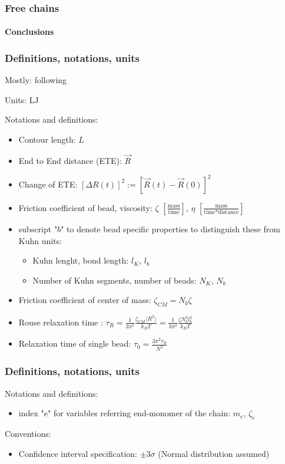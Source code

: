 \documentclass[handout]{beamer}
\newcommand{\mean}[1]{\langle #1 \rangle}
\begin{document}
\begin{frame}
    \frametitle{Free chains}
    \framesubtitle{Conclusions}

\end{frame}

\begin{frame}
    \frametitle{Definitions, notations, units}
    Mostly: following \cite{svaneborg_2020}

    Units: LJ

    Notations and definitions:

    \begin{itemize}
        \item Contour length: $L$
        \item End to End distance (ETE): $\vec{R}$
        \item Change of ETE: $[\Delta R(t)]^2 := [\vec{R}(t)-\vec{R}(0)]^2$
        \item Friction coefficient of bead, viscosity: $\zeta$ $[\frac{\textrm{mass}}{\textrm{time}}]$, $\eta$ $[\frac{\textrm{mass}}{\textrm{time} * \textrm{distance}}]$
        \item subscript "$b$" to denote bead speciﬁc properties to distinguish these from Kuhn units:
            \begin{itemize}
                \item Kuhn lenght, bond length: $l_K$, $l_b$
                \item Number of Kuhn segments, number of beads: $N_K$, $N_b$
            \end{itemize}
        \item Friction coefficient of center of mass: $\zeta_{CM}=N_b \zeta$ 
        \item Rouse relaxation time \cite{svaneborg_2020}: $\tau_R = \frac{1}{3 \pi^2} \frac{\zeta_{CM} \mean{R^2}}{k_B T} = \frac{1}{3 \pi^2} \frac{\zeta N_b^2 l_b^2}{k_B T}$
        \item Relaxation time of single bead: $\tau_0 = \frac{3\pi^2 \tau_R}{N^2}$ 
    \end{itemize}

\end{frame}

\begin{frame}
    \frametitle{Definitions, notations, units}

    Notations and definitions:

    \begin{itemize}
        \item index "e" for variables referring end-monomer of the chain: $m_e$, $\zeta_e$ 
    \end{itemize}
    \vspace{1cm}
    Conventions:
    \begin{itemize}
        \item Confidence interval specification: $\pm 3\sigma$ (Normal distribution assumed)
    \end{itemize}
\end{frame}
    
\end{document}
